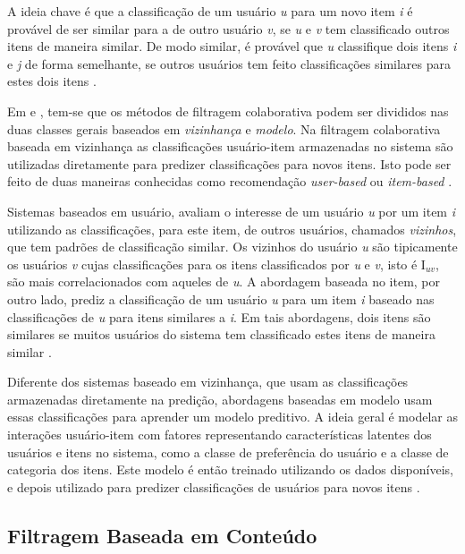 A ideia chave é que a classificação de um usuário \textit{u} para um novo item \textit{i} é provável de ser similar para a de outro usuário \textit{v}, se \textit{u} e \textit{v} tem classificado outros itens de maneira similar. De modo similar, é provável que \textit{u} classifique dois itens \textit{i} e \textit{j} de forma semelhante, se outros usuários tem feito classificações similares para estes dois itens \citep{ricci2011recommender}.

Em \cite{Burke:2002:HRS:586321.586352} e \cite{Burke:2007:HWR:1768197.1768211}, tem-se que os métodos de filtragem colaborativa podem ser divididos nas duas classes gerais baseados em \textit{vizinhança} e \textit{modelo}. Na filtragem colaborativa baseada em vizinhança as classificações usuário-item armazenadas no sistema são utilizadas diretamente para predizer classificações para novos itens. Isto pode ser feito de duas maneiras conhecidas como recomendação \textit{user-based} ou \textit{item-based} \citep{ricci2011recommender}.

Sistemas baseados em usuário, avaliam o interesse de um usuário \textit{u} por um item \textit{i} utilizando as classificações, para este item, de outros usuários, chamados \textit{vizinhos}, que tem padrões de classificação similar. Os vizinhos do usuário \textit{u} são tipicamente os usuários \textit{v} cujas classificações para os itens classificados por \textit{u} e \textit{v}, isto é I{$_{uv}$}, são mais correlacionados com aqueles de \textit{u}. A abordagem baseada no item, por outro lado, prediz a classificação de um usuário \textit{u} para um item \textit{i} baseado nas classificações de \textit{u} para itens similares a \textit{i}. Em tais abordagens, dois itens são similares se muitos usuários do sistema tem classificado estes itens de maneira similar \citep{ricci2011recommender}.

Diferente dos sistemas baseado em vizinhança, que usam as classificações armazenadas diretamente na predição, abordagens baseadas em modelo usam essas classificações para aprender um modelo preditivo. A ideia geral é modelar as interações usuário-item com fatores representando características latentes dos usuários e itens no sistema, como a classe de preferência do usuário e a classe de categoria dos itens. Este modelo é então treinado utilizando os dados disponíveis, e depois utilizado para predizer classificações de usuários para novos itens \citep{ricci2011recommender}.

\subsection{Filtragem Baseada em Conteúdo}

